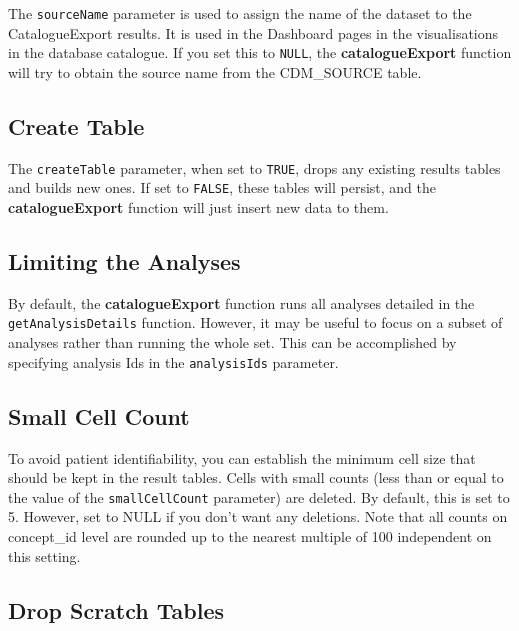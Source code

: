 \documentclass[
]{article}
\begin{document}
The \texttt{sourceName} parameter is used to assign the name of the
dataset to the CatalogueExport results. It is used in the Dashboard
pages in the visualisations in the database catalogue. If you set this
to \texttt{NULL}, the \textbf{catalogueExport} function will try to
obtain the source name from the CDM\_SOURCE table.

\hypertarget{create-table}{%
\subsection{Create Table}\label{create-table}}

The \texttt{createTable} parameter, when set to \texttt{TRUE}, drops any
existing results tables and builds new ones. If set to \texttt{FALSE},
these tables will persist, and the \textbf{catalogueExport} function
will just insert new data to them.

\hypertarget{limiting-the-analyses}{%
\subsection{Limiting the Analyses}\label{limiting-the-analyses}}

By default, the \textbf{catalogueExport} function runs all analyses
detailed in the \texttt{getAnalysisDetails} function. However, it may be
useful to focus on a subset of analyses rather than running the whole
set. This can be accomplished by specifying analysis Ids in the
\texttt{analysisIds} parameter.

\hypertarget{small-cell-count}{%
\subsection{Small Cell Count}\label{small-cell-count}}

To avoid patient identifiability, you can establish the minimum cell
size that should be kept in the result tables. Cells with small counts
(less than or equal to the value of the \texttt{smallCellCount}
parameter) are deleted. By default, this is set to 5. However, set to
NULL if you don't want any deletions. Note that all counts on
concept\_id level are rounded up to the nearest multiple of 100
independent on this setting.

\hypertarget{drop-scratch-tables}{%
\subsection{Drop Scratch Tables}\label{drop-scratch-tables}}
\end{document}
